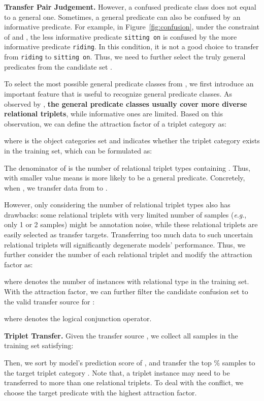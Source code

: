 \documentclass[runningheads]{llncs}
\newcommand{\eg}{\textit{e}.\textit{g}.}
\begin{document}
\smallskip
\noindent
\textbf{Transfer Pair Judgement.}
However, a confused predicate class does not equal to a general one.
Sometimes, a general predicate can also be confused by an informative predicate.
For example, in Figure~\ref{fig:confusion}, under the constraint of  and , the less informative predicate \texttt{sitting on} is confused by the more informative predicate \texttt{riding}.
In this condition, it is not a good choice to transfer from \texttt{riding} to \texttt{sitting on}.
Thus, we need to further select the truly general predicates from the candidate set .


To select the most possible general predicate classes from , we first introduce an important feature that is useful to recognize general predicate classes. As observed by \cite{yu2020cogtree}, \textbf{the general predicate classes usually cover more diverse relational triplets}, while informative ones are limited.
Based on this observation, we can define the attraction factor of a triplet category  as:

where  is the object categories set and  indicates whether the triplet category  exists in the training set, which can be formulated as:

The denominator of  is the number of relational triplet types containing . 
Thus,  with smaller value means  is more likely to be a general predicate.
Concretely, when , we transfer data from  to .

However, only considering the number of relational triplet types also has drawbacks: 
some relational triplets with very limited number of samples (\eg, only 1 or 2 samples) might be annotation noise, while these relational triplets are easily selected as transfer targets.
Transferring too much data to such uncertain relational triplets will significantly degenerate models' performance.
Thus, we further consider the number of each relational triplet and modify the attraction factor as:

where  denotes the number of instances with relational type  in the training set.
With the attraction factor, we can further filter the candidate confusion set  to the valid transfer source for : 

where  denotes the logical conjunction operator.

\smallskip
\noindent
\textbf{Triplet Transfer.}
Given the transfer source , we collect all samples in the training set satisfying:

Then, we sort  by model's prediction score of , and transfer the top \% samples to the target triplet category .
Note that, a triplet instance may need to be transferred to more than one relational triplets.
To deal with the conflict, we choose the target predicate with the highest attraction factor.
\end{document}
